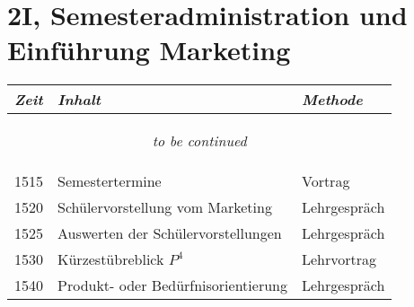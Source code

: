 \documentclass[a4paper]{scrreprt}
\begin{document}
\section*{2I, Semesteradministration und Einführung Marketing}
\begin{longtable}{p{1.5cm}>{\RaggedRight}p{7.5cm}p{2.5cm}}
    \toprule
    \emph{Zeit}&\emph{Inhalt}&\emph{Methode}\\
    \midrule
    \endhead

    \midrule
    \multicolumn{3}{c}{\begin{tiny}\textit{to be continued}\end{tiny}}\\
    \midrule
    \endfoot

    \bottomrule
    \endlastfoot

    1515&Semestertermine&Vortrag\\ [5pt]

    1520&Schülervorstellung vom Marketing&Lehrgespräch\\ [5pt]

    1525&Auswerten der Schülervorstellungen&Lehrgespräch\\ [5pt]

    1530&Kürzestübreblick $P^4$&Lehrvortrag\\ [5pt]

    1540&Produkt- oder Bedürfnisorientierung&Lehrgespräch\\ [5pt]

\end{longtable}
\end{document}
